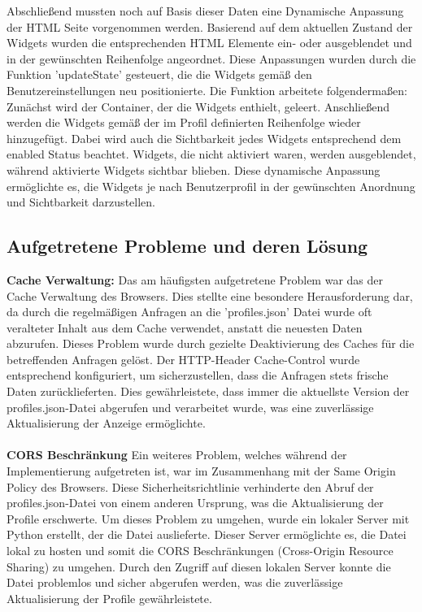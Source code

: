 Abschließend mussten noch auf Basis dieser Daten eine Dynamische Anpassung der HTML Seite vorgenommen werden.  Basierend auf dem aktuellen Zustand der Widgets wurden die entsprechenden HTML Elemente ein- oder ausgeblendet und in der gewünschten Reihenfolge angeordnet. Diese Anpassungen wurden durch die Funktion 'updateState' gesteuert, die die Widgets gemäß den Benutzereinstellungen neu positionierte. Die Funktion arbeitete folgendermaßen: Zunächst wird der Container, der die Widgets enthielt, geleert. Anschließend werden die Widgets gemäß der im Profil definierten Reihenfolge wieder hinzugefügt. Dabei wird auch die Sichtbarkeit jedes Widgets entsprechend dem enabled Status beachtet. Widgets, die nicht aktiviert waren, werden ausgeblendet, während aktivierte Widgets sichtbar blieben. Diese dynamische Anpassung ermöglichte es, die Widgets je nach Benutzerprofil in der gewünschten Anordnung und Sichtbarkeit darzustellen.

\subsection*{Aufgetretene Probleme und deren Lösung}
\textbf{Cache Verwaltung:} Das am häufigsten aufgetretene Problem war das der Cache Verwaltung des Browsers. Dies stellte eine besondere Herausforderung dar, da durch die regelmäßigen Anfragen an die 'profiles.json' Datei wurde oft veralteter Inhalt aus dem Cache verwendet, anstatt die neuesten Daten abzurufen. Dieses Problem wurde durch gezielte Deaktivierung des Caches für die betreffenden Anfragen gelöst. Der HTTP-Header Cache-Control wurde entsprechend konfiguriert, um sicherzustellen, dass die Anfragen stets frische Daten zurücklieferten. Dies gewährleistete, dass immer die aktuellste Version der profiles.json-Datei abgerufen und verarbeitet wurde, was eine zuverlässige Aktualisierung der Anzeige ermöglichte. \\ \\
\noindent
\textbf{CORS Beschränkung} Ein weiteres Problem, welches während der Implementierung aufgetreten ist, war im Zusammenhang mit der Same Origin Policy des Browsers. Diese Sicherheitsrichtlinie verhinderte den Abruf der profiles.json-Datei von einem anderen Ursprung, was die Aktualisierung der Profile erschwerte. Um dieses Problem zu umgehen, wurde ein lokaler Server mit Python erstellt, der die Datei auslieferte. Dieser Server ermöglichte es, die Datei lokal zu hosten und somit die CORS Beschränkungen (Cross-Origin Resource Sharing) zu umgehen. Durch den Zugriff auf diesen lokalen Server konnte die Datei problemlos und sicher abgerufen werden, was die zuverlässige Aktualisierung der Profile gewährleistete.
\\ \\

